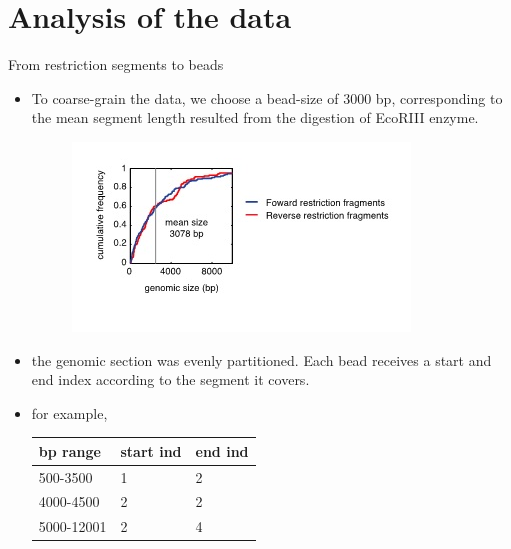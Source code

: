 \documentclass[8pt]{beamer}
\begin{document}
\section{Analysis of the data}\label{section_analysisOfTheData}
\begin{frame}{From restriction segments to beads}
\begin{itemize}
\item To coarse-grain the data, we choose a bead-size of 3000 bp, corresponding to the mean segment length resulted from the digestion of EcoRIII enzyme. 

\begin{figure}[H]
\includegraphics[scale=0.55]{restrictionSegmentLengthDistributionLucaetal}
\end{figure}
\item the genomic section was evenly partitioned. Each bead receives a start and end index according to the segment it covers. 
\item for example, 
\begin{tabular}[H]{|l| l| l|}
\hline
bp range & start ind & end ind\\
\hline
500-3500   & 1         & 2 \\
4000-4500  & 2         & 2 \\   
5000-12001 & 2         & 4 \\       
\hline  
\end{tabular}
\end{itemize}
\end{frame}
\end{document}
